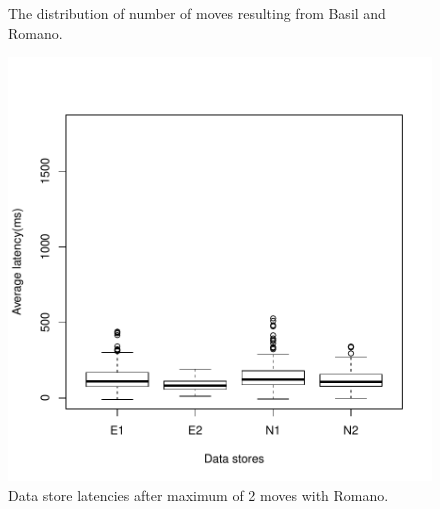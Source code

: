 \begin{figure}
\centering
{}
\caption{
The distribution of number of moves resulting from Basil and Romano.
}
\label{moves}
\end{figure}
\begin{figure}
\centering
\includegraphics[width=\textwidth]{figure/romano_latency_2moves.pdf}
\caption{Data store latencies after maximum of 2 moves with Romano.}
\label{two}
\end{figure}
